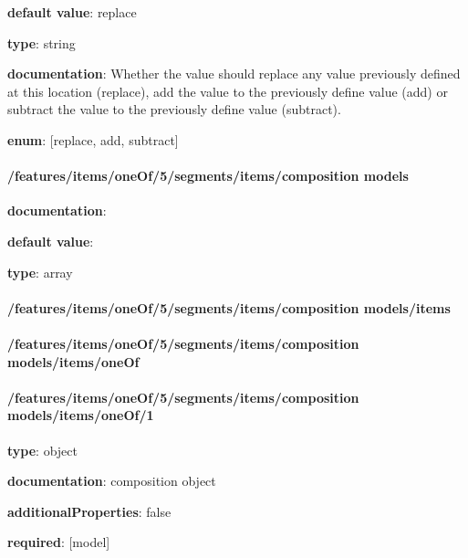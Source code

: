 \begin{itemized}
\item {\bf default value}: replace
\item {\bf type}: string
\item {\bf documentation}: Whether the value should replace any value previously defined at this location (replace), add the value to the previously define value (add) or subtract the value to the previously define value (subtract).
\item {\bf enum}: [replace, add, subtract]\end{itemized}\paragraph{/features/items/oneOf/5/segments/items/composition models} \begin{itemized}
\item {\bf documentation}: 
\item {\bf default value}: 
\item {\bf type}: array
\paragraph{/features/items/oneOf/5/segments/items/composition models/items} \begin{itemized}
\end{itemized}\end{itemized}\paragraph{/features/items/oneOf/5/segments/items/composition models/items/oneOf} \begin{itemized}
\end{itemized}\paragraph{/features/items/oneOf/5/segments/items/composition models/items/oneOf/1} \begin{itemized}
\item {\bf type}: object
\item {\bf documentation}: composition object
\item {\bf additionalProperties}: false
\item {\bf required}: [model]\end{itemized}
